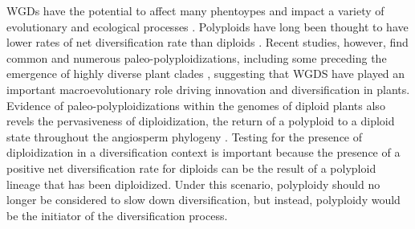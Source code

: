 WGDs have the potential to affect many phentoypes and impact a variety of evolutionary \citep{ramsey_2002} and ecological processes \citep{sessa_2019}.
Polyploids have long been thought to have lower rates of net diversification rate than diploids \citep{mayrose_2011, mayrose_2015}. 
Recent studies, however, find common and numerous paleo-polyploidizations, including some preceding the emergence of highly diverse plant clades \citep{soltis_2014, landis_2018}, suggesting that WGDS have played an important macroevolutionary role driving innovation and diversification in plants.
Evidence of paleo-polyploidizations within the genomes of diploid plants also revels the pervasiveness of diploidization, the return of a polyploid to a diploid state throughout the angiosperm phylogeny \citep{soltis_2015diploidization, dodsworth_2015}. Testing for the presence of diploidization in a diversification context is important because the presence of a positive net diversification rate for diploids can be  the result of a polyploid lineage that has been diploidized. Under this scenario, polyploidy should no longer be considered to slow down diversification, but instead, polyploidy would be the initiator of the diversification process. 

